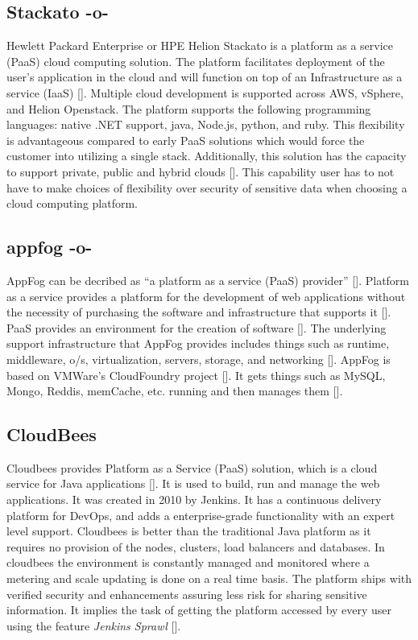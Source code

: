 \subsection{Stackato -o-}
    
Hewlett Packard Enterprise or HPE Helion Stackato is a platform as a
service (PaaS) cloud computing solution.  The platform facilitates
deployment of the user's application in the cloud and will function on
top of an Infrastructure as a service (IaaS) [\cite{www-hpe}]. Multiple
cloud development is supported across AWS, vSphere, and Helion
Openstack.  The platform supports the following programming languages:
native .NET support, java, Node.js, python, and ruby.  This
flexibility is advantageous compared to early PaaS solutions which
would force the customer into utilizing a single stack.  Additionally,
this solution has the capacity to support private, public and hybrid
clouds [\cite{www-virt}]. This capability user has to not have to make
choices of flexibility over security of sensitive data when choosing a
cloud computing platform.


 
    
\subsection{appfog -o-}

AppFog can be decribed as ``a platform as a service (PaaS)
provider'' [\cite{wee}]. Platform as a service provides a platform for
the development of web applications without the necessity of
purchasing the software and infrastructure that supports
it [\cite{kepes}]. PaaS provides an environment for the creation of
software [\cite{kepes}]. The underlying support infrastructure that
AppFog provides includes things such as runtime, middleware, o/s,
virtualization, servers, storage, and networking [\cite{appfog}]. AppFog
is based on VMWare's CloudFoundry project [\cite{wee}]. It gets things
such as MySQL, Mongo, Reddis, memCache, etc. running and then manages
them [\cite{tweney}].


    
\subsection{CloudBees}

Cloudbees provides Platform as a Service (PaaS) solution, which is a
cloud service for Java applications [\cite{www-cloudbees-wiki}]. It is
used to build, run and manage the web applications. It was created in
2010 by Jenkins. It has a continuous delivery platform for DevOps, and
adds a enterprise-grade functionality with an expert level
support. Cloudbees is better than the traditional Java platform as it
requires no provision of the nodes, clusters, load balancers and
databases. In cloudbees the environment is constantly managed and
monitored where a metering and scale updating is done on a real time
basis. The platform ships with verified security and enhancements
assuring less risk for sharing sensitive information. It implies the
task of getting the platform accessed by every user using the feature
\textit{Jenkins Sprawl} [\cite{www-cloudbees-webpage}].

